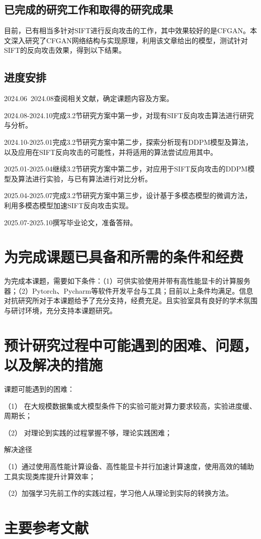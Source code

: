 \subsection{已完成的研究工作和取得的研究成果}
目前，已有相当多针对SIFT进行反向攻击的工作，其中效果较好的是CFGAN。本文深入研究了CFGAN网络结构与实现原理，利用该文章给出的模型，测试针对SIFT的反向攻击效果，得到以下结果。
\subsection{进度安排}
      2024.06~2024.08\quad 查阅相关文献，确定课题内容及方案。
\par  2024.08-2024.10\quad 完成3.2节研究方案中第一步，对现有SIFT反向攻击算法进行研究与分析。
\par  2024.10-2025.01\quad 完成3.2节研究方案中第二步，探索分析现有DDPM模型及算法，以及应用在SIFT反向攻击的可能性，并将适用的算法尝试应用其中。
\par  2025.01-2025.04\quad 继续3.2节研究方案中第二步，对应用于SIFT反向攻击的DDPM模型及算法进行实验，与已有算法进行对比分析。
\par  2025.04-2025.07\quad 完成3.2节研究方案中第三步，设计基于多模态模型的微调方法，利用多模态模型加速SIFT反向攻击实现。
\par  2025.07-2025.10\quad 撰写毕业论文，准备答辩。
\section{为完成课题已具备和所需的条件和经费}
为完成本课题，需要如下条件：（1）可供实验使用并带有高性能显卡的计算服务器；（2）Pytorch、Pycharm等软件开发平台与工具；目前以上条件均满足。信息对抗研究所对于本课题给予了充分支持，经费充足。且实验室具有良好的学术氛围与研讨环境，充分支持本课题研究。
\section{预计研究过程中可能遇到的困难、问题，以及解决的措施}
课题可能遇到的困难：
\par （1） 在大规模数据集或大模型条件下的实验可能对算力要求较高，实验进度缓、周期长；
\par （2） 对理论到实践的过程掌握不够，理论实践困难；
\par 解决途径
\par （1）通过使用高性能计算设备、高性能显卡并行加速计算速度，使用高效的辅助工具实现类库提升计算效率；
\par （2）加强学习先前工作的实践过程，学习他人从理论到实际的转换方法。
\section{主要参考文献}



